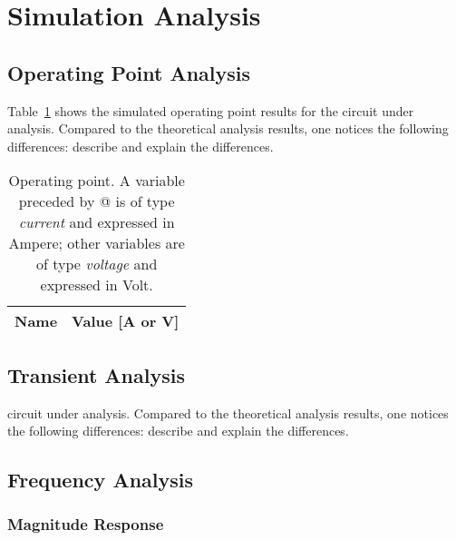 \section{Simulation Analysis}
\label{sec:simulation}

\subsection{Operating Point Analysis}

Table~\ref{tab:op} shows the simulated operating point results for the circuit
under analysis. Compared to the theoretical analysis results, one notices the
following differences: describe and explain the differences.

\begin{table}[h]
  \centering
  \begin{tabular}{|l|r|}
    \hline    
    {\bf Name} & {\bf Value [A or V]} \\ \hline
    
  \end{tabular}
  \caption{Operating point. A variable preceded by @ is of type {\em current}
    and expressed in Ampere; other variables are of type {\it voltage} and expressed in
    Volt.}
  \label{tab:op}
\end{table}

\lipsum[1-1]


\subsection{Transient Analysis}

circuit under analysis. Compared to the theoretical analysis results, one
notices the following differences: describe and explain the differences.


\lipsum[1-1]



\subsection{Frequency Analysis}

\subsubsection{Magnitude Response}

